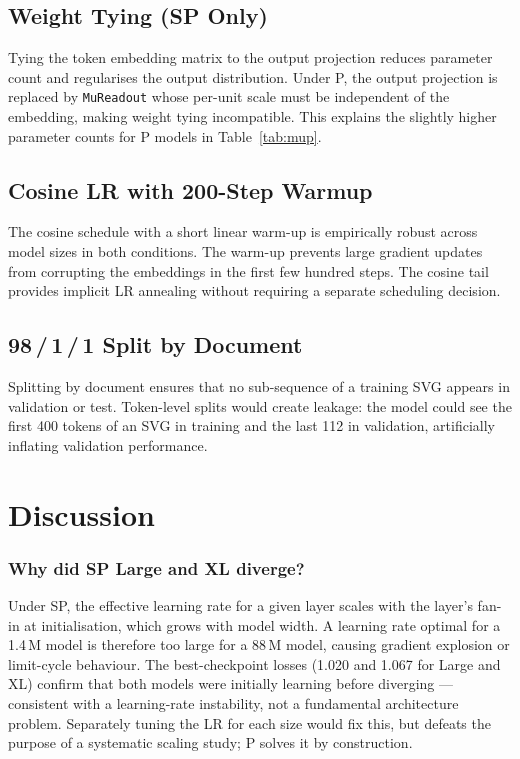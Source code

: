 \documentclass[11pt,a4paper]{article}
\begin{document}
\subsection{Weight Tying (SP Only)}

Tying the token embedding matrix to the output projection reduces parameter count and
regularises the output distribution.  Under \textmu P, the output projection is replaced
by \texttt{MuReadout} whose per-unit scale must be independent of the embedding, making
weight tying incompatible.  This explains the slightly higher parameter counts for
\textmu P models in Table~\ref{tab:mup}.

\subsection{Cosine LR with 200-Step Warmup}

The cosine schedule with a short linear warm-up is empirically robust across model sizes
in both conditions.  The warm-up prevents large gradient updates from corrupting the
embeddings in the first few hundred steps.  The cosine tail provides implicit LR
annealing without requiring a separate scheduling decision.

\subsection{98\,/\,1\,/\,1 Split by Document}

Splitting by document ensures that no sub-sequence of a training SVG appears in
validation or test.  Token-level splits would create leakage: the model could see the
first 400 tokens of an SVG in training and the last 112 in validation, artificially
inflating validation performance.

\section{Discussion}

\subsubsection*{Why did SP Large and XL diverge?}

Under SP, the effective learning rate for a given layer scales with the layer's fan-in
at initialisation, which grows with model width.  A learning rate optimal for a 1.4\,M
model is therefore too large for a 88\,M model, causing gradient explosion or
limit-cycle behaviour.  The best-checkpoint losses (1.020 and 1.067 for Large and XL)
confirm that both models were initially learning before diverging --- consistent with a
learning-rate instability, not a fundamental architecture problem.  Separately tuning the
LR for each size would fix this, but defeats the purpose of a systematic scaling study;
\textmu P solves it by construction.
\end{document}
